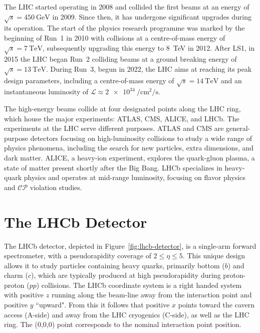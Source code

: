 The LHC started operating in 2008 and collided the first beams at an energy of $\sqrt{s}=\SI{450}{\giga\eV}$ in 2009. Since then, it has undergone significant upgrades during its operation. The start of the physics research programme was marked by the beginning of Run~1 in 2010 with collisions at a centre-of-mass energy of  $\sqrt{s}=\SI{7}{\tera\eV}$, subsequently upgrading this energy to \SI{8}{\tera\eV} in 2012. After LS1, in 2015 the LHC began Run~2 colliding beams at a ground breaking energy of  $\sqrt{s}=\SI{13}{\tera\eV}$. During Run~3, begun in 2022, the LHC aims at reaching its peak design parameters, including a centre-of-mass energy of $\sqrt{s}=\SI{14}{\tera\eV}$ and an instantaneous luminosity of $\mathcal{L}\approx\SI{2e34}{\per\centi\meter\squared\per\second}$.

The high-energy beams collide at four designated points along the LHC ring, which house the major experiments: ATLAS, CMS, ALICE, and LHCb.
The experiments at the LHC serve different purposes. ATLAS and CMS are general-purpose detectors focusing on high-luminosity collisions to study a wide range of physics phenomena, including the search for new particles, extra dimensions, and dark matter. ALICE, a heavy-ion experiment, explores the quark-gluon plasma, a state of matter present shortly after the Big Bang. LHCb specializes in heavy-quark physics and operates at mid-range luminosity, focusing on flavor physics and $\mathcal{CP}$ violation studies.

\section{The LHCb Detector}\label{sec:detector}

The LHCb detector, depicted in Figure~\ref{fig:lhcb-detector}, is a single-arm forward spectrometer, with a pseudorapidity coverage of $2 \leq \eta \leq 5$. This unique design allows it to study particles containing heavy quarks, primarily bottom ($b$) and charm ($c$), which are typically produced at high pseudorapidity during proton-proton ($pp$) collisions. The LHCb coordinate system is a right handed system with positive $z$ running along the beam-line away from the interaction point and positive $y$ ``upward". From this it follows that positive $x$ points toward the cavern access (A-side) and away from the LHC cryogenics (C-side), as well as the LHC ring. The (0,0,0) point corresponds to the nominal interaction point position.%

